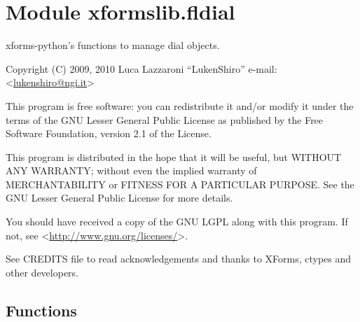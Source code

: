 %
%
%


\section{Module xformslib.fldial}

    \label{xformslib:fldial}

xforms-python's functions to manage dial objects.

Copyright (C) 2009, 2010  Luca Lazzaroni ``LukenShiro''
e-mail: <\href{mailto:lukenshiro@ngi.it}{lukenshiro@ngi.it}>

This program is free software: you can redistribute it and/or modify
it under the terms of the GNU Lesser General Public License as
published by the Free Software Foundation, version 2.1 of the License.

This program is distributed in the hope that it will be useful,
but WITHOUT ANY WARRANTY; without even the implied warranty of
MERCHANTABILITY or FITNESS FOR A PARTICULAR PURPOSE. See the
GNU Lesser General Public License for more details.

You should have received a copy of the GNU LGPL along with this
program. If not, see <\href{http://www.gnu.org/licenses/}{http://www.gnu.org/licenses/}>.

See CREDITS file to read acknowledgements and thanks to XForms,
ctypes and other developers.


  \subsection{Functions}

    \label{xformslib:fldial:fl_add_dial}

